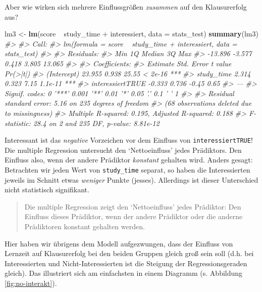 \documentclass[12pt,ngerman,]{book}
\makeatletter
\newenvironment{Shaded}{\begin{snugshade}}{\end{snugshade}}
\newcommand{\KeywordTok}[1]{\textcolor[rgb]{0.13,0.29,0.53}{\textbf{{#1}}}}
\newcommand{\DataTypeTok}[1]{\textcolor[rgb]{0.13,0.29,0.53}{{#1}}}
\newcommand{\StringTok}[1]{\textcolor[rgb]{0.31,0.60,0.02}{{#1}}}
\newcommand{\CommentTok}[1]{\textcolor[rgb]{0.56,0.35,0.01}{\textit{{#1}}}}
\newcommand{\NormalTok}[1]{{#1}}
\newenvironment{kframe}{%
\medskip{}
\setlength{\fboxsep}{.8em}
 \def\at@end@of@kframe{}%
 \ifinner\ifhmode%
  \def\at@end@of@kframe{\end{minipage}}%
  \begin{minipage}{\columnwidth}%
 \fi\fi%
 \def\FrameCommand##1{\hskip\@totalleftmargin \hskip-\fboxsep
 \colorbox{shadecolor}{##1}\hskip-\fboxsep
     \hskip-\linewidth \hskip-\@totalleftmargin \hskip\columnwidth}%
 \MakeFramed {\advance\hsize-\width
   \@totalleftmargin\z@ \linewidth\hsize
   \@setminipage}}%
 {\par\unskip\endMakeFramed%
 \at@end@of@kframe}
\renewenvironment{Shaded}{\begin{kframe}}{\end{kframe}}
\theoremstyle{definition}
\theoremstyle{definition}
\theoremstyle{remark}
\makeatother
\begin{document}
Aber wie wirken sich mehrere Einflussgrößen \emph{zusammen} auf den
Klausurerfolg aus?

\begin{Shaded}
\begin{Highlighting}[]
\NormalTok{lm3 <-}\StringTok{ }\KeywordTok{lm}\NormalTok{(score ~}\StringTok{ }\NormalTok{study_time +}\StringTok{ }\NormalTok{interessiert, }\DataTypeTok{data =} \NormalTok{stats_test)}
\KeywordTok{summary}\NormalTok{(lm3)}
\CommentTok{#> }
\CommentTok{#> Call:}
\CommentTok{#> lm(formula = score ~ study_time + interessiert, data = stats_test)}
\CommentTok{#> }
\CommentTok{#> Residuals:}
\CommentTok{#>     Min      1Q  Median      3Q     Max }
\CommentTok{#> -13.896  -3.577   0.418   3.805  13.065 }
\CommentTok{#> }
\CommentTok{#> Coefficients:}
\CommentTok{#>                  Estimate Std. Error t value Pr(>|t|)    }
\CommentTok{#> (Intercept)        23.955      0.938   25.55  < 2e-16 ***}
\CommentTok{#> study_time          2.314      0.323    7.15  1.1e-11 ***}
\CommentTok{#> interessiertTRUE   -0.333      0.736   -0.45     0.65    }
\CommentTok{#> ---}
\CommentTok{#> Signif. codes:  0 '***' 0.001 '**' 0.01 '*' 0.05 '.' 0.1 ' ' 1}
\CommentTok{#> }
\CommentTok{#> Residual standard error: 5.16 on 235 degrees of freedom}
\CommentTok{#>   (68 observations deleted due to missingness)}
\CommentTok{#> Multiple R-squared:  0.195,  Adjusted R-squared:  0.188 }
\CommentTok{#> F-statistic: 28.4 on 2 and 235 DF,  p-value: 8.81e-12}
\end{Highlighting}
\end{Shaded}

Interessant ist das \emph{negative} Vorzeichen vor dem Einfluss von
\texttt{interessiertTRUE}! Die multiple Regression untersucht den
`Nettoeinfluss' jedes Prädiktors. Den Einfluss also, wenn der andere
Prädiktor \emph{konstant} gehalten wird. Anders gesagt: Betrachten wir
jeden Wert von \texttt{study\_time} separat, so haben die Interessierten
jeweils im Schnitt etwas \emph{weniger} Punkte (jesses). Allerdings ist
dieser Unterschied nicht statistisch signifikant.

\begin{quote}
Die multiple Regression zeigt den `Nettoeinfluss' jedes Prädiktor: Den
Einfluss dieses Prädiktor, wenn der andere Prädiktor oder die anderne
Prädiktoren konstant gehalten werden.
\end{quote}

Hier haben wir übrigens dem Modell aufgezwungen, dass der Einfluss von
Lernzeit auf Klausurerfolg bei den beiden Gruppen gleich groß sein soll
(d.h. bei Interessierten und Nicht-Interessierten ist die Steigung der
Regressionsgeraden gleich). Das illustriert sich am einfachsten in einem
Diagramm (s. Abbildung \ref{fig:no-interakt}).
\end{document}
